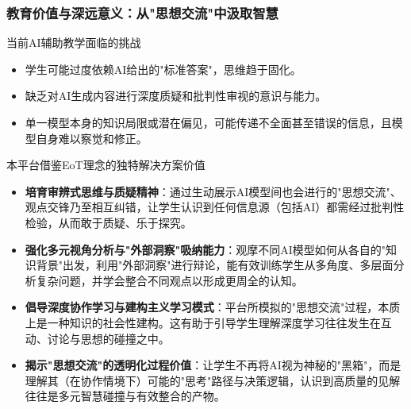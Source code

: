 \documentclass[aspectratio=169]{beamer} %
\begin{document}
\begin{frame}
\frametitle{教育价值与深远意义：从"思想交流"中汲取智慧}
\begin{alertblock}{当前AI辅助教学面临的挑战}
\begin{itemize}
    \item 学生可能过度依赖AI给出的"标准答案"，思维趋于固化。
    \item 缺乏对AI生成内容进行深度质疑和批判性审视的意识与能力。
    \item 单一模型本身的知识局限或潜在偏见，可能传递不全面甚至错误的信息，且模型自身难以察觉和修正。
\end{itemize}
\end{alertblock}

\begin{block}{本平台借鉴EoT理念的独特解决方案价值}
\begin{itemize}
    \item \textbf{培育审辨式思维与质疑精神}：通过生动展示AI模型间也会进行的"思想交流"、观点交锋乃至相互纠错，让学生认识到任何信息源（包括AI）都需经过批判性检验，从而敢于质疑、乐于探究。
    \item \textbf{强化多元视角分析与"外部洞察"吸纳能力}：观摩不同AI模型如何从各自的"知识背景"出发，利用"外部洞察"进行辩论，能有效训练学生从多角度、多层面分析复杂问题，并学会整合不同观点以形成更周全的认知。
    \item \textbf{倡导深度协作学习与建构主义学习模式}：平台所模拟的"思想交流"过程，本质上是一种知识的社会性建构。这有助于引导学生理解深度学习往往发生在互动、讨论与思想的碰撞之中。
    \item \textbf{揭示"思想交流"的透明化过程价值}：让学生不再将AI视为神秘的"黑箱"，而是理解其（在协作情境下）可能的"思考"路径与决策逻辑，认识到高质量的见解往往是多元智慧碰撞与有效整合的产物。
\end{itemize}
\end{block}
\end{frame}
\end{document}
